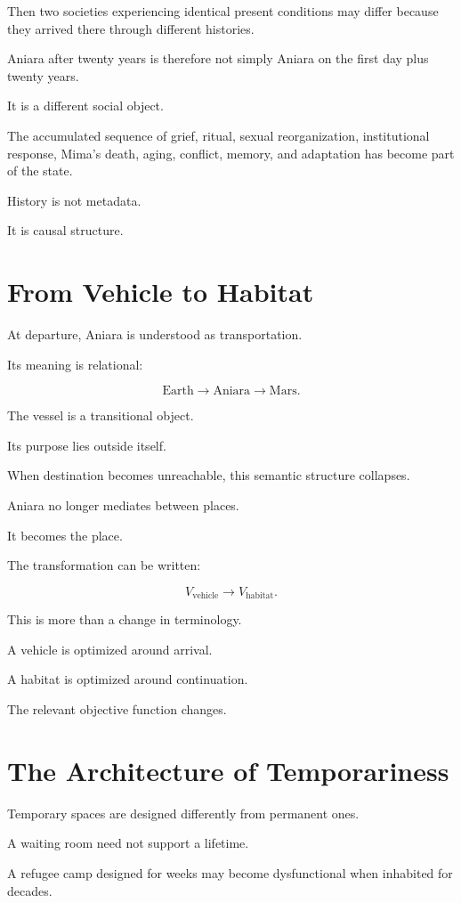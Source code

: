 \documentclass[11pt,oneside]{book}
\theoremstyle{definition}
\theoremstyle{remark}
\begin{document}
Then two societies experiencing identical present conditions may differ because they arrived there through different histories.

Aniara after twenty years is therefore not simply Aniara on the first day plus twenty years.

It is a different social object.

The accumulated sequence of grief, ritual, sexual reorganization, institutional response, Mima's death, aging, conflict, memory, and adaptation has become part of the state.

History is not metadata.

It is causal structure.

\section{From Vehicle to Habitat}

At departure, Aniara is understood as transportation.

Its meaning is relational:

\[
\text{Earth}
\rightarrow
\text{Aniara}
\rightarrow
\text{Mars}.
\]

The vessel is a transitional object.

Its purpose lies outside itself.

When destination becomes unreachable, this semantic structure collapses.

Aniara no longer mediates between places.

It becomes the place.

The transformation can be written:

\[
V_{\mathrm{vehicle}}
\rightarrow
V_{\mathrm{habitat}}.
\]

This is more than a change in terminology.

A vehicle is optimized around arrival.

A habitat is optimized around continuation.

The relevant objective function changes.

\section{The Architecture of Temporariness}

Temporary spaces are designed differently from permanent ones.

A waiting room need not support a lifetime.

A refugee camp designed for weeks may become dysfunctional when inhabited for decades.
\end{document}

